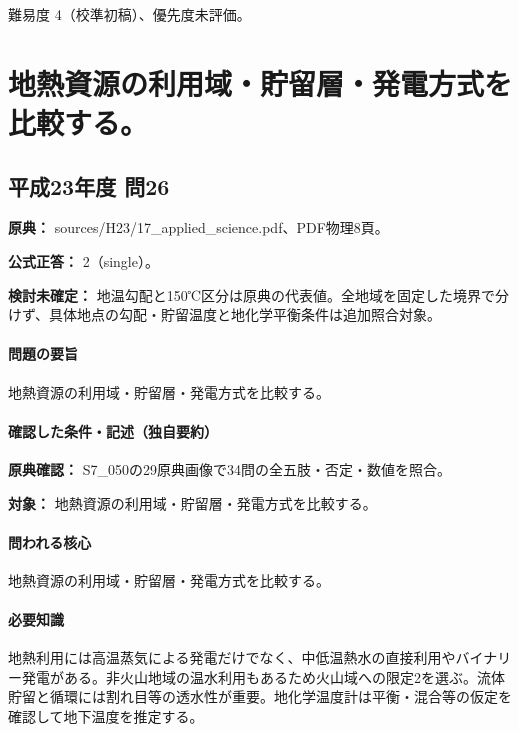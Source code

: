 \par 難易度 4（校準初稿）、優先度未評価。

\section{地熱資源の利用域・貯留層・発電方式を比較する。}

\subsection{平成23年度 問26}
\label{q:h23-reg-applied-26}

\noindent\textbf{原典：} sources/H23/17\_applied\_science.pdf、PDF物理8頁。

\textbf{公式正答：} 2（single）。

\par\textbf{検討未確定：} 地温勾配と150℃区分は原典の代表値。全地域を固定した境界で分けず、具体地点の勾配・貯留温度と地化学平衡条件は追加照合対象。

\paragraph{問題の要旨} 地熱資源の利用域・貯留層・発電方式を比較する。

\paragraph{確認した条件・記述（独自要約）}\mbox{}\par

\noindent\textbf{原典確認：} S7\_050の29原典画像で34問の全五肢・否定・数値を照合。\par

\noindent\textbf{対象：} 地熱資源の利用域・貯留層・発電方式を比較する。\par

\paragraph{問われる核心} 地熱資源の利用域・貯留層・発電方式を比較する。

\paragraph{必要知識} 地熱利用には高温蒸気による発電だけでなく、中低温熱水の直接利用やバイナリー発電がある。非火山地域の温水利用もあるため火山域への限定2を選ぶ。流体貯留と循環には割れ目等の透水性が重要。地化学温度計は平衡・混合等の仮定を確認して地下温度を推定する。


